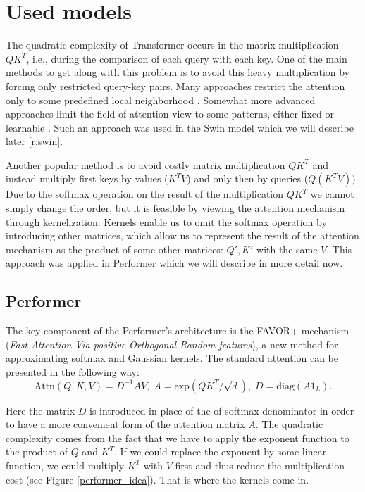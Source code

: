 \documentclass[magisterska,en]{pracamgr}
\begin{document}
\chapter{Used models}\label{r:sparse_transformers}

The quadratic complexity of Transformer occurs in the matrix multiplication $QK^T$, i.e., during the comparison of each query with each key. One of the main methods to get along with this problem is to avoid this heavy multiplication by forcing only restricted query-key pairs. Many approaches restrict the attention only to some predefined local neighborhood \cite{DBLP:conf/icml/ParmarVUKSKT18}. Somewhat more advanced approaches limit the field of attention view to some patterns, either fixed or learnable \cite{DBLP:journals/csur/TayDBM23}. Such an approach was used in the Swin model \cite{DBLP:conf/iccv/LiuL00W0LG21} which we will describe later \ref{r:swin}.

Another popular method is to avoid costly matrix multiplication $QK^T$ and instead multiply first keys by values ($K^TV$) and only then by queries ($Q(K^TV))$. Due to the softmax operation on the result of the multiplication $QK^T$ we cannot simply change the order, but it is feasible by viewing the attention mechanism through kernelization. Kernels enable us to omit the softmax operation by introducing other matrices, which allow us to represent the result of the attention mechanism as the product of some other matrices: $Q', K'$ with the same $V$. This approach was applied in Performer \cite{DBLP:conf/iclr/ChoromanskiLDSG21} which we will describe in more detail now.


\section{Performer}\label{r:performer}


The key component of the Performer's architecture is the FAVOR+ mechanism (\textit{Fast Attention Via positive Orthogonal Random features}), a new method for approximating softmax and Gaussian kernels. The standard attention can be presented in the following way:
\begin{equation}
    \textrm{Attn}(Q, K, V) = D^{-1}AV, \; A=\textrm{exp}\left(QK^T/\sqrt{d}\right), \; 
    D = \textrm{diag}\left(A1_{L}\right).
\end{equation}\label{attention_equation}

Here the matrix $D$ is introduced in place of the of softmax denominator in order to have a more convenient form of the attention matrix $A$. The quadratic complexity comes from the fact that we have to apply the exponent function to the product of $Q$ and $K^T$. If we could replace the exponent by some linear function, we could multiply $K^T$ with $V$ first and thus reduce the multiplication cost (see Figure \ref{performer_idea}). That is where the kernels come in. 
\end{document}
